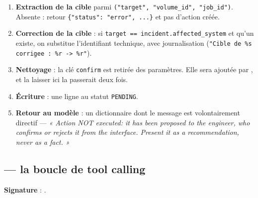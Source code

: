 \begin{enumerate}
  \item \textbf{Extraction de la cible} parmi \texttt{("target", "volume\_id",
  "job\_id")}. Absente : retour \texttt{\{"status": "error", ...\}} et pas
  d'action créée.
  \item \textbf{Correction de la cible} : si \texttt{target ==
  incident.affected\_system} et qu'un  existe, on substitue
  l'identifiant technique, avec journalisation
  (\texttt{"Cible de \%s corrigee : \%r -> \%r"}).
  \item \textbf{Nettoyage} : la clé \texttt{confirm} est retirée des paramètres.
  Elle sera ajoutée par , et la laisser ici la
  passerait deux fois.
  \item \textbf{Écriture} : 
  \arrowto{} une ligne  au statut \texttt{PENDING}.
  \item \textbf{Retour au modèle} : un dictionnaire dont le message est
  volontairement directif ---
  \emph{« Action NOT executed: it has been proposed to the engineer, who
  confirms or rejects it from the interface. Present it as a recommendation,
  never as a fact. »}
\end{enumerate}

\subsection{ --- la boucle de tool calling}

\textbf{Signature} : .

